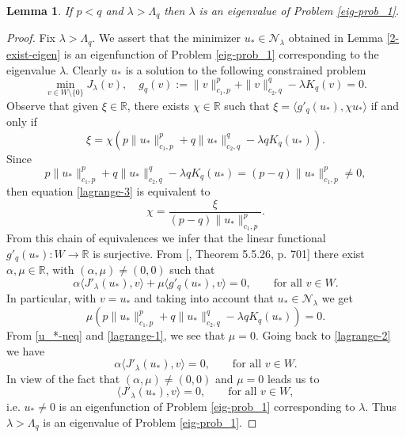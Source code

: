 \documentclass[pdflatex,sn-mathphys-num]{sn-jnl}
\theoremstyle{thmstyleone}%
\newtheorem{lem}[theorem]{Lemma}
\theoremstyle{thmstyletwo}%
\theoremstyle{thmstylethree}%
\theoremstyle{thmstylethree}%
\begin{document}
\begin{lem}\label{lagrange_lambda} 
    If $p<q$ and $\lambda >\Lambda_q$ then $\lambda$ is an eigenvalue of Problem \eqref{eig-prob_1}.
\end{lem}
\begin{proof}
   Fix $\lambda>\Lambda_q$. We assert that the minimizer $u_*\in \mathcal{N}_\lambda$ obtained in Lemma \ref{2-exist-eigen} is an eigenfunction of Problem \eqref{eig-prob_1} corresponding to the eigenvalue $\lambda$.
    Clearly $u_*$ is a solution to the following constrained problem
    \begin{equation*}
        \min_{v\in W\setminus\{0\}}J_\lambda(v), \quad g_q(v):=\|v\|_{c_1,p}^p+\|v\|_{c_2,q}^q-\lambda K_q(v)=0.
    \end{equation*}
  Observe that given $\xi \in \mathbb{R}$, there exists $\chi \in \mathbb{R}$ such that $\xi=\langle g'_q(u_*), \chi u_*\rangle$ if and only if 
    \begin{equation}\label{lagrange-3}
        \xi = \chi \left(p\|u_*\|_{c_1, p}^p+q\|u_*\|_{c_2, q}^q-\lambda qK_q(u_*)\right).
    \end{equation}
    Since \begin{equation}\label{u_*-neq}
        p\|u_*\|_{c_1, p}^p+q\|u_*\|_{c_2, q}^q-\lambda qK_q(u_*)=(p-q)\|u_*\|_{c_1, p}^p\neq 0 ,
    \end{equation}  then equation \eqref{lagrange-3} is equivalent to 
    \begin{equation*}
     \chi =\frac{\xi}{(p-q)\|u_*\|_{c_1, p}^p}.   
    \end{equation*}
    From this chain of equivalences we infer that the linear functional $g'_q(u_*):W \to \mathbb{R}$ is surjective. 
    From [\cite{GP}, Theorem 5.5.26, p. 701] there exist $\alpha, \mu \in \mathbb{R}$, with $(\alpha, \mu)\neq (0,0)$ such that \begin{equation}\label{lagrange-2}
        \alpha\langle J'_\lambda (u_*), v\rangle+\mu \langle g'_q(u_*), v \rangle=0, \qquad \text{for all $v\in W$}.
    \end{equation} 
    In particular, with $v=u_*$ and taking into account that $u_*\in\mathcal{N}_\lambda$ we get
    \begin{equation}\label{lagrange-1}
        \mu \left(p\|u_*\|_{c_1, p}^p+q\|u_*\|_{c_2, q}^q-\lambda qK_q(u_*)\right)=0.
    \end{equation}
From \eqref{u_*-neq} and \eqref{lagrange-1}, we see that $\mu=0$. Going back to \eqref{lagrange-2} we have
    \begin{equation*}
      \alpha\langle J'_\lambda (u_*), v\rangle=0,  \qquad \text{for all $v\in W$}.
    \end{equation*}
   In view of the fact that $(\alpha, \mu)\neq (0,0)$ and $\mu=0$ leads us to 
    \begin{equation*}
        \langle J'_\lambda (u_*), v\rangle=0,  \qquad \text{for all $v\in W$},
    \end{equation*}
    i.e. $u_*\neq 0$ is an eigenfunction of Problem \eqref{eig-prob_1} corresponding to $\lambda$. Thus $\lambda>\Lambda_q$ is an eigenvalue of Problem \eqref{eig-prob_1}.
\end{proof}
\end{document}
